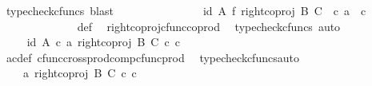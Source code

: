\begin{isabellebody}
\ {\isacharparenleft}{\kern0pt}typecheck{\isacharunderscore}{\kern0pt}cfuncs{\isacharcomma}{\kern0pt}\ blast{\isacharparenright}{\kern0pt}\isanewline
\ \ \ \ \ \ \ \ \ \ \isamarkupfalse%
\ \isamarkupfalse%
\ {\isachardoublequoteopen}{\isachardot}{\kern0pt}{\isachardot}{\kern0pt}{\isachardot}{\kern0pt}\ {\isacharequal}{\kern0pt}\ {\isacharparenleft}{\kern0pt}id\ A\ {\isasymtimes}\isactrlsub f\ right{\isacharunderscore}{\kern0pt}coproj\ B\ C{\isacharparenright}{\kern0pt}\ \ {\isasymcirc}\isactrlsub c\ {\isasymlangle}a{\isacharprime}{\kern0pt}{\isacharcomma}{\kern0pt}\ \ c{\isacharprime}{\kern0pt}{\isasymrangle}{\isachardoublequoteclose}\isanewline
\ \ \ \ \ \ \ \ \ \ \ \ \isamarkupfalse%
\ {\isasymphi}{\isacharunderscore}{\kern0pt}def\ \isamarkupfalse%
\ right{\isacharunderscore}{\kern0pt}coproj{\isacharunderscore}{\kern0pt}cfunc{\isacharunderscore}{\kern0pt}coprod\ \isamarkupfalse%
\ {\isacharparenleft}{\kern0pt}typecheck{\isacharunderscore}{\kern0pt}cfuncs{\isacharcomma}{\kern0pt}\ auto{\isacharparenright}{\kern0pt}\isanewline
\ \ \ \ \ \ \ \ \ \ \isamarkupfalse%
\ \isamarkupfalse%
\ {\isachardoublequoteopen}{\isachardot}{\kern0pt}{\isachardot}{\kern0pt}{\isachardot}{\kern0pt}\ {\isacharequal}{\kern0pt}\ {\isasymlangle}id\ A\ {\isasymcirc}\isactrlsub c\ a{\isacharprime}{\kern0pt}{\isacharcomma}{\kern0pt}\ right{\isacharunderscore}{\kern0pt}coproj\ B\ C\ {\isasymcirc}\isactrlsub c\ c{\isacharprime}{\kern0pt}{\isasymrangle}{\isachardoublequoteclose}\isanewline
\ \ \ \ \ \ \ \ \ \ \ \ \isamarkupfalse%
\ a{\isacharprime}{\kern0pt}c{\isacharprime}{\kern0pt}{\isacharunderscore}{\kern0pt}def\ cfunc{\isacharunderscore}{\kern0pt}cross{\isacharunderscore}{\kern0pt}prod{\isacharunderscore}{\kern0pt}comp{\isacharunderscore}{\kern0pt}cfunc{\isacharunderscore}{\kern0pt}prod\ \isamarkupfalse%
\ {\isacharparenleft}{\kern0pt}typecheck{\isacharunderscore}{\kern0pt}cfuncs{\isacharcomma}{\kern0pt}auto{\isacharparenright}{\kern0pt}\isanewline
\ \ \ \ \ \ \ \ \ \ \isamarkupfalse%
\ \isamarkupfalse%
\ {\isachardoublequoteopen}{\isachardot}{\kern0pt}{\isachardot}{\kern0pt}{\isachardot}{\kern0pt}\ {\isacharequal}{\kern0pt}\ \ {\isasymlangle}a{\isacharprime}{\kern0pt}{\isacharcomma}{\kern0pt}\ right{\isacharunderscore}{\kern0pt}coproj\ B\ C\ {\isasymcirc}\isactrlsub c\ c{\isacharprime}{\kern0pt}{\isasymrangle}{\isachardoublequoteclose}\isanewline
\ \ \ \ \ \ \ \ \ \ \ \ \isamarkupfalse%

\end{isabellebody}
